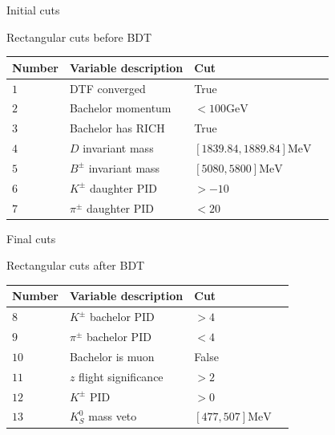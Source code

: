 \documentclass{beamer}
\begin{document}
\begin{frame}{Initial cuts}
  \begin{center}
    Rectangular cuts before BDT
  \end{center}
  \centering
  \def\arraystretch{1.2}%
  \begin{tabular}{lllc} 
    \hline
    Number & Variable description   & Cut \\
    \hline
    $1$    & DTF converged          & True \\
    $2$    & Bachelor momentum      & $< 100\si{\giga\eV}$ \\
    $3$    & Bachelor has RICH      & True \\
    $4$    & $D$ invariant mass     & $[1839.84, 1889.84]\si{\mega\eV}$ \\
    $5$    & $B^\pm$ invariant mass & $[5080, 5800]\si{\mega\eV}$ \\
    $6$    & $K^\pm$ daughter PID   & $> -10$ \\
    $7$    & $\pi^\pm$ daughter PID & $< 20$ \\
    \hline
  \end{tabular}
\end{frame}

\begin{frame}{Final cuts}
  \begin{center}
    Rectangular cuts after BDT
  \end{center}
  \centering
  \def\arraystretch{1.2}%
  \begin{tabular}{lllc} 
    \hline
    Number & Variable description     & Cut \\
    \hline
    $8$    & $K^\pm$ bachelor PID     & $> 4$ \\
    $9$    & $\pi^\pm$ bachelor PID   & $< 4$ \\
    $10$   & Bachelor is muon         & False \\
    $11$   & $z$ flight significance  & $> 2$ \\
    $12$   & $K^\pm$ PID              & $> 0$ \\
    $13$   & $K_S^0$ mass veto        & $[477, 507]\si{\mega\eV}$ \\
    \hline
  \end{tabular}
\end{frame}
\end{document}
